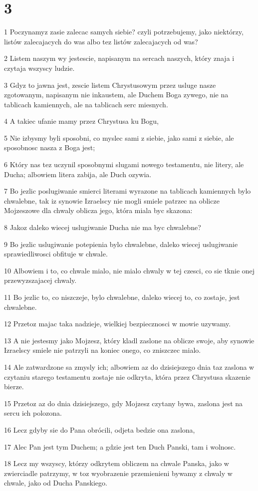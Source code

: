 \chapter{3}

\par 1 Poczynamyz zasie zalecac samych siebie? czyli potrzebujemy, jako niektórzy, listów zalecajacych do was albo tez listów zalecajacych od was?
\par 2 Listem naszym wy jestescie, napisanym na sercach naszych, który znaja i czytaja wszyscy ludzie.
\par 3 Gdyz to jawna jest, zescie listem Chrystusowym przez usluge nasze zgotowanym, napisanym nie inkaustem, ale Duchem Boga zywego, nie na tablicach kamiennych, ale na tablicach serc miesnych.
\par 4 A takiec ufanie mamy przez Chrystusa ku Bogu,
\par 5 Nie izbysmy byli sposobni, co myslec sami z siebie, jako sami z siebie, ale sposobnosc nasza z Boga jest;
\par 6 Który nas tez uczynil sposobnymi slugami nowego testamentu, nie litery, ale Ducha; albowiem litera zabija, ale Duch ozywia.
\par 7 Bo jezlic poslugiwanie smierci literami wyrazone na tablicach kamiennych bylo chwalebne, tak iz synowie Izraelscy nie mogli smiele patrzec na oblicze Mojzeszowe dla chwaly oblicza jego, która miala byc skazona:
\par 8 Jakoz daleko wiecej uslugiwanie Ducha nie ma byc chwalebne?
\par 9 Bo jezlic uslugiwanie potepienia bylo chwalebne, daleko wiecej uslugiwanie sprawiedliwosci obfituje w chwale.
\par 10 Albowiem i to, co chwale mialo, nie mialo chwaly w tej czesci, co sie tknie onej przewyzszajacej chwaly.
\par 11 Bo jezlic to, co niszczeje, bylo chwalebne, daleko wiecej to, co zostaje, jest chwalebne.
\par 12 Przetoz majac taka nadzieje, wielkiej bezpiecznosci w mowie uzywamy.
\par 13 A nie jestesmy jako Mojzesz, który kladl zaslone na oblicze swoje, aby synowie Izraelscy smiele nie patrzyli na koniec onego, co zniszczec mialo.
\par 14 Ale zatwardzone sa zmysly ich; albowiem az do dzisiejszego dnia taz zaslona w czytaniu starego testamentu zostaje nie odkryta, która przez Chrystusa skazenie bierze.
\par 15 Przetoz az do dnia dzisiejszego, gdy Mojzesz czytany bywa, zaslona jest na sercu ich polozona.
\par 16 Lecz gdyby sie do Pana obrócili, odjeta bedzie ona zaslona,
\par 17 Alec Pan jest tym Duchem; a gdzie jest ten Duch Panski, tam i wolnosc.
\par 18 Lecz my wszyscy, którzy odkrytem obliczem na chwale Panska, jako w zwierciadle patrzymy, w toz wyobrazenie przemienieni bywamy z chwaly w chwale, jako od Ducha Panskiego.

